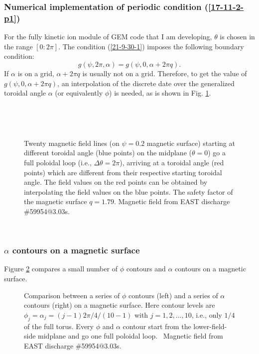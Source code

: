 \documentclass{llncs}
\begin{document}
\subsubsection{Numerical implementation of periodic condition
(\ref{17-11-2-p1})}

For the fully kinetic ion module of GEM code that I am developing, $\theta$ is
chosen in the range $[0 : 2 \pi]$. The condition (\ref{21-9-30-1}) imposes the
following boundary condition:
\begin{equation}
  g (\psi, 2 \pi, \alpha) = g (\psi, 0, \alpha + 2 \pi q) .
\end{equation}
If $\alpha$ is on a grid, $\alpha + 2 \pi q$ is usually not on a grid.
Therefore, to get the value of $g (\psi, 0, \alpha + 2 \pi q)$, an
interpolation of the discrete date over the generalized toroidal angle
$\alpha$ (or equivalently $\phi$) is needed, as is shown in Fig.
\ref{17-11-2-1}.

\

\

\begin{figure}[h]
  \caption{\label{17-11-2-1}Twenty magnetic field lines (on $\psi = 0.2$
  magnetic surface) starting at different toroidal angle (blue points) on the
  midplane ($\theta = 0$) go a full poloidal loop (i.e., $\Delta \theta = 2
  \pi$), arriving at a toroidal angle (red points) which are different from
  their respective starting toroidal angle. The field values on the red points
  can be obtained by interpolating the field values on the blue points. The
  safety factor of the magnetic surface $q = 1.79$. Magnetic field from EAST
  discharge \#59954@3.03s.}
\end{figure}

\

\subsubsection{$\alpha$ contours on a magnetic surface}

Figure \ref{17-10-29-1} compares a small number of $\phi$ contours and
$\alpha$ contours on a magnetic surface.

\begin{figure}[h]
  \caption{\label{17-10-29-1}Comparison between a series of $\phi$ contours
  (left) and a series of $\alpha$ contours (right) on a magnetic surface. Here
  contour levels are $\phi_j = \alpha_j = (j - 1) 2 \pi / 4 / (10 - 1)$ with
  $j = 1, 2, \ldots, 10$, i.e., only $1 / 4$ of the full torus. Every $\phi$
  and $\alpha$ contour start from the lower-field-side midplane and go one
  full poloidal loop. \ Magnetic field from EAST discharge \#59954@3.03s.}
\end{figure}
\end{document}
